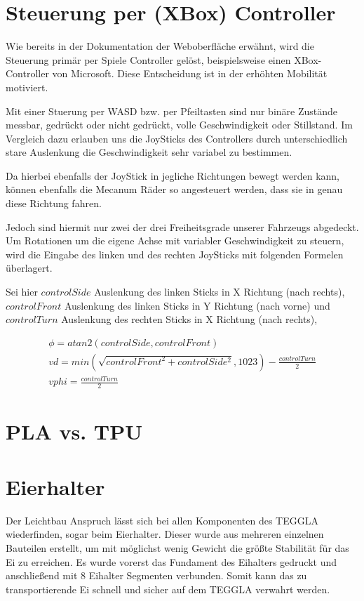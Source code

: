 \section{Steuerung per (XBox) Controller}
Wie bereits in der Dokumentation der Weboberfläche erwähnt, wird die Steuerung primär per Spiele Controller gelöst, beispielsweise einen XBox-Controller von Microsoft.
Diese Entscheidung ist in der erhöhten Mobilität motiviert. 

Mit einer Stuerung per WASD bzw. per Pfeiltasten sind nur binäre Zustände messbar, gedrückt oder nicht gedrückt, volle Geschwindigkeit oder Stillstand.
Im Vergleich dazu erlauben uns die JoySticks des Controllers durch unterschiedlich stare Auslenkung die Geschwindigkeit sehr variabel zu bestimmen.

Da hierbei ebenfalls der JoyStick in jegliche Richtungen bewegt werden kann, können ebenfalls die Mecanum Räder so angesteuert werden, dass sie in genau diese Richtung fahren.

Jedoch sind hiermit nur zwei der drei Freiheitsgrade unserer Fahrzeugs abgedeckt. Um Rotationen um die eigene Achse mit variabler Geschwindigkeit zu steuern, wird die Eingabe des linken und des rechten JoySticks mit folgenden Formelen überlagert.

\bigskip
Sei hier $controlSide$ Auslenkung des linken Sticks in X Richtung (nach rechts), 
$controlFront$ Auslenkung des linken Sticks in Y Richtung (nach vorne) und 
$controlTurn$ Auslenkung des rechten Sticks in X Richtung (nach rechts), 

\begin{align}
	\phi = atan2(controlSide, controlFront)\\
	vd = min(\sqrt{controlFront^2 + controlSide^2}, 1023) - \frac{controlTurn}{2}\\
	vphi = \frac{controlTurn}{2}
\end{align}


\section{PLA vs. TPU}

\section{Eierhalter}					
Der Leichtbau Anspruch lässt sich bei allen Komponenten des TEGGLA wiederfinden, sogar beim Eierhalter. 
Dieser wurde aus mehreren einzelnen Bauteilen erstellt, um mit möglichst wenig Gewicht die größte Stabilität für das Ei zu erreichen. 
Es wurde vorerst das Fundament des Eihalters gedruckt und anschließend mit 8 Eihalter Segmenten verbunden. 
Somit kann das zu transportierende Ei schnell und sicher auf dem TEGGLA verwahrt werden. 

